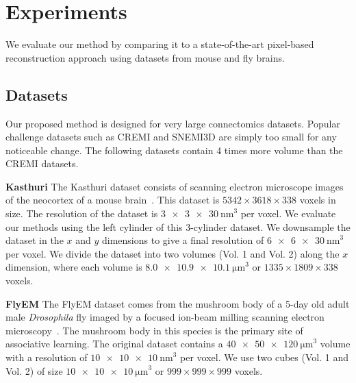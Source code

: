 \section{Experiments}

We evaluate our method by comparing it to a state-of-the-art pixel-based reconstruction approach using datasets from mouse and fly brains.

\subsection{Datasets}
\label{sec:dataset}

Our proposed method is designed for very large connectomics datasets. 
Popular challenge datasets such as CREMI and SNEMI3D are simply too small for any noticeable change. 
The following datasets contain 4 times more volume than the CREMI datasets. 

\noindent\textbf{Kasthuri}
The Kasthuri dataset consists of scanning electron microscope images of the neocortex of a mouse brain~\cite{kasthuri2015saturated}. 
This dataset is $5342 \times 3618 \times 338$ voxels in size. 
The resolution of the dataset is $\SI[product-units=single]{3 x 3 x 30}{\nano\meter}^3$ per voxel. 
We evaluate our methods using the left cylinder of this 3-cylinder dataset. 
We downsample the dataset in the $x$ and $y$ dimensions to give a final resolution of $\SI[product-units=single]{6 x 6 x 30}{\nano\meter}^3$ per voxel. 
We divide the dataset into two volumes (Vol. 1 and Vol. 2) along the $x$ dimension, where each volume is $\SI[product-units=single]{8.0 x 10.9 x 10.1}{\micro\meter}^3$ or $1335 \times 1809 \times 338$ voxels.

\noindent\textbf{FlyEM}
The FlyEM dataset comes from the mushroom body of a 5-day old adult male \textit{Drosophila} fly imaged by a focused ion-beam milling scanning electron microscopy~\cite{takemura2017connectome}.
The mushroom body in this species is the primary site of associative learning. 
The original dataset contains a $\SI[product-units=single]{40 x 50 x 120}{\micro\meter}^3$ volume with a resolution of $\SI[product-units=single]{10 x 10 x 10}{\nano\meter}^3$ per voxel. 
We use two cubes (Vol. 1 and Vol. 2) of size $\SI[product-units=single]{10 x 10 x 10}{\micro\meter}^3$ or $999 \times 999 \times 999$ voxels.

